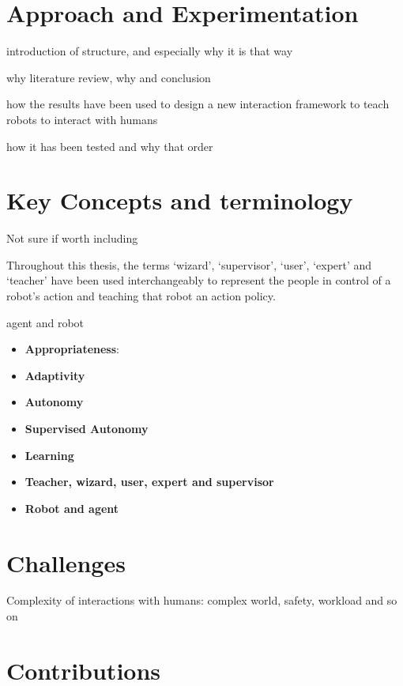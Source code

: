 \section{Approach and Experimentation}\label{sec:intro-exps}

introduction of structure, and especially why it is that way

why literature review, why and conclusion

how the results have been used to design a new interaction framework to teach robots to interact with humans

how it has been tested and why that order

\section{Key Concepts and terminology}\label{sec:intro-concepts}

Not sure if worth including

Throughout this thesis, the terms `wizard', `supervisor', `user', `expert' and `teacher' have been used interchangeably to represent the people in control of a robot's action and teaching that robot an action policy.

agent and robot

\begin{itemize}
	\item \textbf{Appropriateness}:
	\item \textbf{Adaptivity}
	\item \textbf{Autonomy}
	\item \textbf{Supervised Autonomy}
	\item \textbf{Learning}
	\item \textbf{Teacher, wizard, user, expert and supervisor}
	\item \textbf{Robot and agent}
\end{itemize}

\section{Challenges}

Complexity of interactions with humans: complex world, safety, workload and so on

\section{Contributions}\label{sec:intro-contr}

